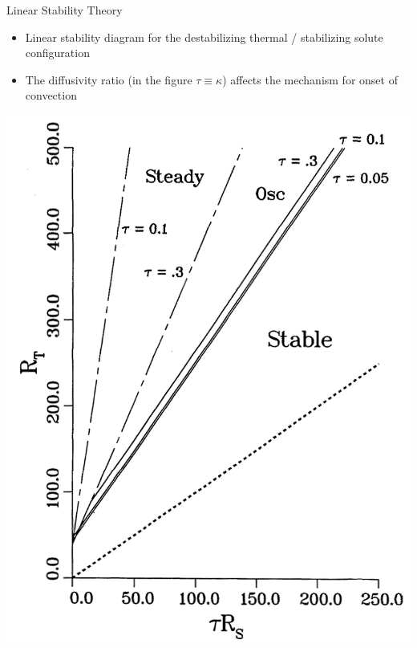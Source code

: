 \documentclass[compress,12pt]{beamer}
\begin{document}
\begin{frame}{Linear Stability Theory}
  \begin{minipage}[h]{.45\textwidth}
    \begin{itemize}
    \item Linear stability diagram for the destabilizing thermal / stabilizing solute configuration
    \item The diffusivity ratio (in the figure $\tau \equiv \kappa$) affects the mechanism for onset of convection
    \end{itemize}
  \end{minipage}
  \hspace{.1in}
  \begin{minipage}[h]{.5\textwidth}
  \centerline{\includegraphics[height=.85\textheight]{figures/stability_diagram}}
  \end{minipage}
\end{frame}
\end{document}
